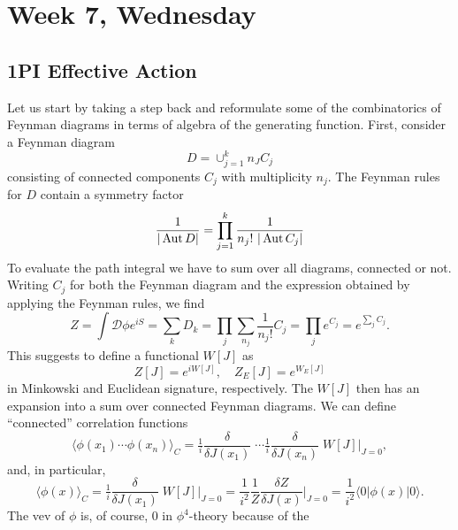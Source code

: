 \documentclass[12pt]{article}
\begin{document}
\section{Week 7, Wednesday}

\subsection{1PI Effective Action}

Let us start by taking a step back and reformulate some of the
combinatorics of Feynman diagrams in terms of algebra of the
generating function. First, consider a Feynman diagram
\begin{equation}
  D = \cup_{j=1}^k n_J C_j
\end{equation}
consisting of connected components $C_j$ with multiplicity $n_j$. The
Feynman rules for $D$ contain a symmetry factor
\begin{equation}
  \frac{1}{|\operatorname{Aut} D|} =
  \prod_{j=1}^k \frac{1}{n_j! ~ |\operatorname{Aut} C_j|}
\end{equation}
To evaluate the path integral we have to sum over all diagrams,
connected or not. Writing $C_j$ for both the Feynman diagram and the
expression obtained by applying the Feynman rules, we find
\begin{equation}
  Z = \int \mathcal{D}\phi e^{iS} =
  \sum_k D_k = 
  \prod_j \sum_{n_j} \frac{1}{n_j!} C_j =
  \prod_j e^{C_j} = e^{\sum_j C_j}.
\end{equation}
This suggests to define a functional $W[J]$ as 
\begin{equation}
  Z[J] = e^{i W[J]}
  ,\quad
  Z_E[J] = e^{W_E[J]}
\end{equation}
in Minkowski and Euclidean signature, respectively. The $W[J]$ then
has an expansion into a sum over connected Feynman diagrams. We can
define ``connected'' correlation functions
\begin{equation}
  \langle \phi(x_1) \cdots \phi(x_n) \rangle_C =
  \tfrac{1}{i} \frac{\delta}{\delta J(x_1)} \;
  \cdots
  \tfrac{1}{i} \frac{\delta}{\delta J(x_n)} \;
  W[J] \Big|_{J=0},
\end{equation}
and, in particular,
\begin{equation}
  \langle \phi(x)\rangle_C =
  \tfrac{1}{i} \frac{\delta}{\delta J(x_1)} \;
  W[J] \Big|_{J=0} =
  \frac{1}{i^2} \frac{1}{Z} 
  \frac{\delta Z}{\delta J(x)}  \Big|_{J=0} =
  \frac{1}{i^2} \langle 0|\phi(x) |0\rangle.
\end{equation}
The vev of $\phi$ is, of course, $0$ in $\phi^4$-theory because of the
\end{document}
